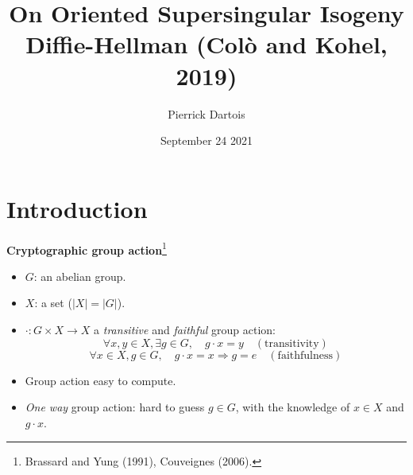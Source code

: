 \documentclass[10pt]{beamer}
\institute{IBM Research Zurich}
\title[On Oriented Supersingular Isogeny Diffie-Hellman]{On Oriented Supersingular Isogeny Diffie-Hellman (Col\`{o} and Kohel, 2019)}
\author{Pierrick Dartois}
\date{September 24 2021}
\theoremstyle{plain}
\theoremstyle{definition}
\renewcommand{\(}{\left(}
\renewcommand{\)}{\right)}
\begin{document}
\begin{frame}
\titlepage
\end{frame}

\begin{frame}
\tableofcontents[hidesubsections]
\end{frame}


\section{Introduction}

\begin{frame}
\textbf{Cryptographic group action}\footnote[frame]{Brassard and Yung (1991), Couveignes (2006).}

\vspace{0.5cm}

\begin{itemize}
\item $G$: an abelian group.
\item $X$: a set ($|X|=|G|$).
\pause 
\item $\cdot : G\times X\longrightarrow X$ a \emph{transitive} and \emph{faithful} group action:
\[\forall x,y\in X, \exists g\in G, \quad g\cdot x=y \quad (\mbox{transitivity})\]
\[\forall x\in X,  g\in G, \quad g\cdot x=x \Longrightarrow g=e \quad (\mbox{faithfulness})\]
\pause
\item Group action easy to compute.
\item \emph{One way} group action: hard to guess $g\in G$, with the knowledge of $x\in X$ and $g\cdot x$.
\end{itemize}

\end{frame}
\end{document}
